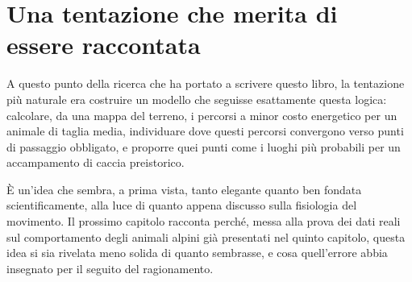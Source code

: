 \section{Una tentazione che merita di essere raccontata}

A questo punto della ricerca che ha portato a scrivere questo libro, la tentazione più naturale era costruire un modello che seguisse esattamente questa logica: calcolare, da una mappa del terreno, i percorsi a minor costo energetico per un animale di taglia media, individuare dove questi percorsi convergono verso punti di passaggio obbligato, e proporre quei punti come i luoghi più probabili per un accampamento di caccia preistorico.

È un'idea che sembra, a prima vista, tanto elegante quanto ben fondata scientificamente, alla luce di quanto appena discusso sulla fisiologia del movimento. Il prossimo capitolo racconta perché, messa alla prova dei dati reali sul comportamento degli animali alpini già presentati nel quinto capitolo, questa idea si sia rivelata meno solida di quanto sembrasse, e cosa quell'errore abbia insegnato per il seguito del ragionamento.
